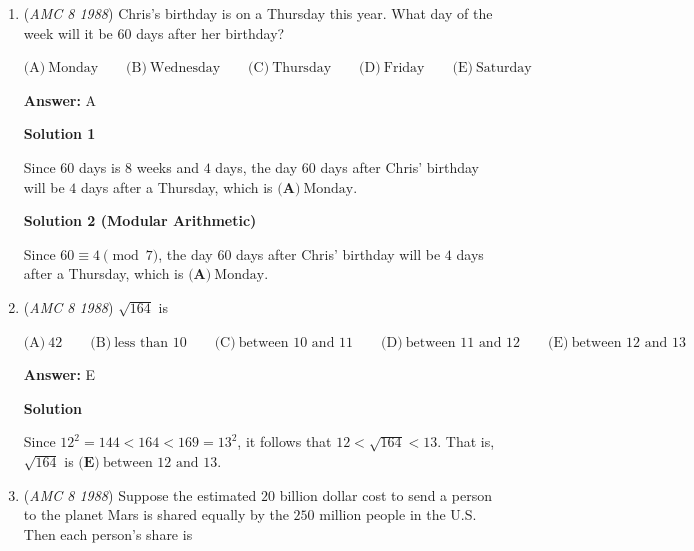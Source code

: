 \begin{enumerate}
 The third triangle has sides of length $2$, $\sqrt{5}$, and $\sqrt{13}$, so it is not isosceles.

 The fourth triangle has two sides of length $\sqrt{10}$ so it is isosceles.

 The fifth triangle has two sides of length $\sqrt{5}$, so it is isosceles.

 So, $\boxed{\textbf{(D)}\ 4}$ of these triangles are isosceles.

 


	\item (\textit{AMC 8 1988}) Chris's birthday is on a Thursday this year.  What day of the week will it be $60$ days after her birthday?


 $\text{(A)}\ \text{Monday} \qquad \text{(B)}\ \text{Wednesday} \qquad \text{(C)}\ \text{Thursday} \qquad \text{(D)}\ \text{Friday} \qquad \text{(E)}\ \text{Saturday}$

 \textbf{Answer: }A



\textbf{Solution 1}

Since $60$ days is $8$ weeks and $4$ days, the day $60$ days after Chris' birthday will be $4$ days after a Thursday, which is $\boxed{\textbf{(A)}\ \text{Monday}}$.

 



\textbf{Solution 2 (Modular Arithmetic)}

Since $60\equiv4\pmod7$, the day $60$ days after Chris' birthday will be $4$ days after a Thursday, which is $\boxed{\textbf{(A)}\ \text{Monday}}$.

 


	\item (\textit{AMC 8 1988}) $\sqrt{164}$ is 


 $\text{(A)}\ 42 \qquad \text{(B)}\ \text{less than }10 \qquad \text{(C)}\ \text{between }10\text{ and }11 \qquad \text{(D)}\ \text{between }11\text{ and }12 \qquad \text{(E)}\ \text{between }12\text{ and }13$

 \textbf{Answer: }E



\textbf{Solution}

Since $12^2 = 144 < 164 < 169 = 13^2$, it follows that $12 < \sqrt{164} < 13$.  That is, $\sqrt{164}$ is $\boxed{\textbf{(E)}\ \text{between }12\text{ and }13}$.

 


	\item (\textit{AMC 8 1988}) Suppose the estimated $20$ billion dollar cost to send a person to the planet Mars is shared equally by the $250$ million people in the U.S. Then each person's share is 



\end{enumerate}
